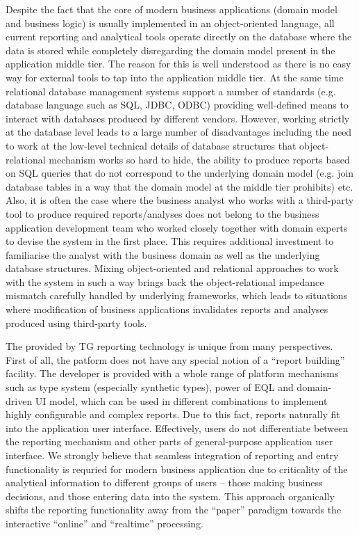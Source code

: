   Despite the fact that the core of modern business applications (domain model and business logic) is usually implemented in an object-oriented language, all current reporting and analytical tools operate directly on the database where the data is stored while completely disregarding the domain model present in the application middle tier.  
  The reason for this is well understood as there is no easy way for external tools to tap into the application middle tier.
  At the same time relational database management systems support a number of standards (e.g. database language such as SQL, JDBC, ODBC) providing well-defined means to interact with databases produced by different vendors.
  However, working strictly at the database level leads to a large number of disadvantages including the need to work at the low-level technical details of database structures that object-relational mechanism works so hard to hide, the ability to produce reports based on SQL queries that do not correspond to the underlying domain model (e.g. join database tables in a way that the domain model at the middle tier prohibits) etc.
  Also, it is often the case where the business analyst who works with a third-party tool to produce required reports/analyses does not belong to the business application development team who worked closely together with domain experts to devise the system in the first place.
  This requires additional investment to familiarise the analyst with the business domain as well as the underlying database structures.
  Mixing object-oriented and relational approaches to work with the system in such a way brings back the object-relational impedance mismatch carefully handled by underlying frameworks, which leads to situations where modification of business applications invalidates reports and analyses produced using third-party tools.

  The provided by TG reporting technology is unique from many perspectives.
  First of all, the patform does not have any special notion of a ``report building'' facility.
  The developer is provided with a whole range of platform mechanisms such as type system (especially synthetic types), power of EQL and domain-driven UI model, which can be used in different combinations to implement highly configurable and complex reports.
  Due to this fact, reports naturally fit into the application user interface.
  Effectively, users do not differentiate between the reporting mechanism and other parts of general-purpose application user interface.
  We strongly believe that seamless integration of reporting and entry functionality is requried for modern business application due to criticality of the analytical information to different groups of users -- those making business decisions, and those entering data into the system.
  This approach organically shifts the reporting functionality away from  the ``paper'' paradigm towards the interactive ``online'' and ``realtime'' processing.

